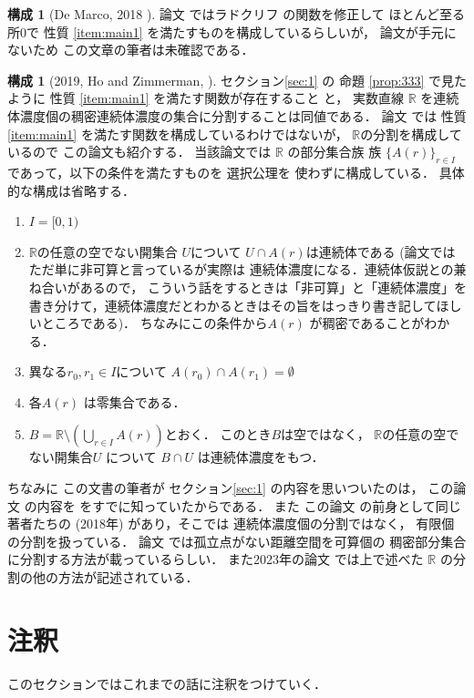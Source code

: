 \documentclass[leqno, a4paper, 12pt]{jsarticle}
\theoremstyle{definition}
\newtheorem{con}[thm]{構成}
\newcommand{\rr}{\mathbb{R}}
\begin{document}
\begin{con}[De Marco, 2018 \cite{MR3756332}]\label{con:dem}
論文\cite{MR3756332}
ではラドクリフ
\cite{MR3453542}
の関数を修正して
ほとんど至る所$0$で
性質
\ref{item:main1}
を満たすものを構成しているらしいが，
論文が手元にないため
この文章の筆者は未確認である．
\end{con}


\begin{con}[2019, Ho and Zimmerman, \cite{MR4022760}]\label{con:hz}
セクション\ref{sec:1}
の
命題
\ref{prop:333}
で見たように
性質
\ref{item:main1}
を満たす関数が存在すること
と，
実数直線
$\rr$
を連続体濃度個の稠密連続体濃度の集合に分割することは同値である．
論文
\cite{MR4022760}
では
性質
\ref{item:main1}
を満たす関数を構成しているわけではないが，
$\rr$の分割を構成しているので
この論文も紹介する．
当該論文では
$\rr$
の部分集合族
族
$\{A(r)\}_{r\in I}$
であって，以下の条件を満たすものを
選択公理を
使わずに構成している．
具体的な構成は省略する．
\begin{enumerate}[label=\textup{(\arabic*)}]
\item 
$I=[0, 1)$
\item $\rr$の任意の空でない開集合
$U$について
$U\cap A(r)$は連続体である
(論文ではただ単に非可算と言っているが実際は
連続体濃度になる．連続体仮説との兼ね合いがあるので，
こういう話をするときは「非可算」と「連続体濃度」を書き分けて，連続体濃度だとわかるときはその旨をはっきり書き記してほしいところである)．
ちなみにこの条件から$A(r)$
が稠密であることがわかる．
\item 
異なる$r_{0}, r_{1}\in I$について
$A(r_{0})\cap A(r_{1})=\emptyset$
\item 
各$A(r)$
は零集合である．
\item 
$B=\rr\setminus \left(\bigcup_{r\in I}A(r)\right)$とおく．
このとき$B$は空ではなく，
$\rr$の任意の空でない開集合$U$
について
$B\cap U$
は連続体濃度をもつ．
\end{enumerate}
ちなみに
この文書の筆者が
セクション\ref{sec:1}
の内容を思いついたのは，
この論文
\cite{MR4022760}の内容を
をすでに知っていたからである．
また
この論文
\cite{MR4022760}
の前身として同じ著者たちの
\cite{MR3779220}(2018年)
があり，そこでは
連続体濃度個の分割ではなく，
有限個の分割を扱っている．
論文
\cite{MR3418216}
では孤立点がない距離空間を可算個の
稠密部分集合に分割する方法が載っているらしい．
また2023年の論文
\cite{MR4573491}
では上で述べた
$\rr$
の分割の他の方法が記述されている．

\end{con}


\section{注釈}\label{sec:3}
このセクションではこれまでの話に注釈をつけていく．
\end{document}
